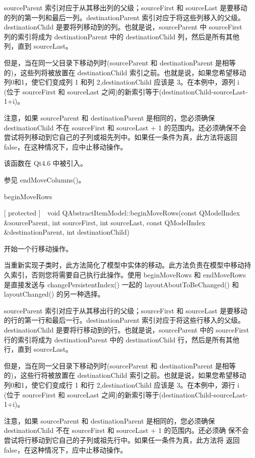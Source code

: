sourceParent 索引对应于从其移出列的父级；sourceFirst 和 sourceLast 是要移动的列的第一列和最后一列。destinationParent 索引对应于将这些列移入的父级。destinationChild 是要将列移动到的列。也就是说，sourceParent 中 sourceFirst 列的索引将成为 destinationParent 中的 destinationChild 列，然后是所有其他列，直到 sourceLast。

但是，当在同一父目录下移动列时(sourceParent 和 destinationParent 是相等的)，这些列将被放置在 destinationChild 索引之前。也就是说，如果您希望移动列0和1，使它们变成列 1 和列 2,destinationChild 应该是 3。在本例中，源列 i (位于 sourceFirst 和 sourceLast 之间)的新索引等于(destinationChild-sourceLast-1+i)。

注意，如果 sourceParent 和 destinationParent 是相同的，您必须确保 destinationChild 不在 sourceFirst 和 sourceLast + 1 的范围内。还必须确保不会尝试将列移动到它自己的子列或祖先列中。如果任一条件为真，此方法将返回 false，在这种情况下，应中止移动操作。

该函数在 Qt4.6 中被引入。

参见 endMoveColumns()。

\splitLine

beginMoveRows

[ protected ] void QAbstractItemModel::beginMoveRows(const QModelIndex \&sourceParent, int sourceFirst, int sourceLast, const QModelIndex \&destinationParent, int destinationChild)

开始一个行移动操作。

当重新实现子类时，此方法简化了模型中实体的移动。此方法负责在模型中移动持久索引，否则您将需要自己执行此操作。使用 beginMoveRows 和 endMoveRows 是直接发送与 changePersistentIndex() 一起的 layoutAboutToBeChanged() 和 layoutChanged() 的另一种选择。

sourceParent 索引对应于从其移出行的父级；sourceFirst 和 sourceLast 是要移动的行的第一行和最后一行。destinationParent 索引对应于将这些行移入的父级。destinationChild 是要将行移动到的行。也就是说，sourceParent 中的 sourceFirst 行的索引将成为 destinationParent 中的 destinationChild 行，然后是所有其他行，直到 sourceLast。

但是，当在同一父目录下移动列时(sourceParent 和 destinationParent 是相等的)，这些行将被放置在 destinationChild 索引之前。也就是说，如果您希望移动列0和1，使它们变成行 1 和行 2,destinationChild 应该是 3。在本例中，源行 i (位于 sourceFirst 和 sourceLast 之间)的新索引等于(destinationChild-sourceLast-1+i)。

注意，如果 sourceParent 和 destinationParent 是相同的，您必须确保
destinationChild 不在 sourceFirst 和 sourceLast + 1 的范围内。还必须确
保不会尝试将行移动到它自己的子列或祖先行中。如果任一条件为真，此方法将
返回 false，在这种情况下，应中止移动操作。


